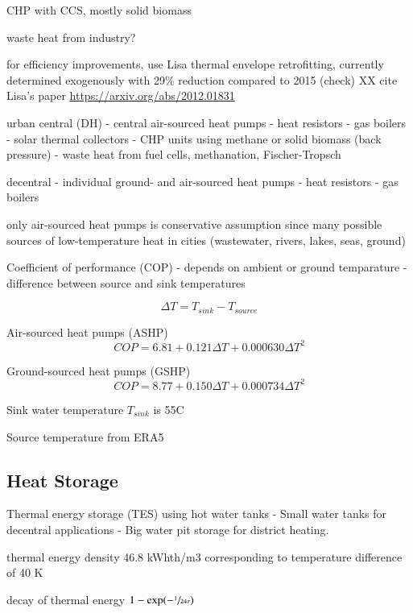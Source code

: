 CHP with CCS, mostly solid biomass

waste heat from industry?

for efficiency improvements, use Lisa thermal envelope retrofitting, currently
determined exogenously with 29\% reduction compared to 2015 (check) XX cite
Lisa's paper \url{https://arxiv.org/abs/2012.01831}

urban central (DH)
- central air-sourced heat pumps 
- heat resistors
- gas boilers
- solar thermal collectors
- CHP units using methane or solid biomass (back pressure)
- waste heat from fuel cells, methanation, Fischer-Tropsch

decentral
- individual ground- and air-sourced heat pumps
- heat resistors
- gas boilers

only air-sourced heat pumps is conservative assumption since many possible sources of
low-temperature heat in cities (wastewater, rivers, lakes, seas, ground)

Coefficient of performance (COP)
- depends on ambient or ground temparature
- difference between source and sink temperatures

\begin{equation}
    \Delta T = T_{sink} - T_{source}
\end{equation}

Air-sourced heat pumps (ASHP)
\begin{equation}
    COP = 6.81 + 0.121 \Delta T + 0.000630 \Delta T^2
\end{equation}

Ground-sourced heat pumps (GSHP)
\begin{equation}
    COP = 8.77 + 0.150 \Delta T + 0.000734 \Delta T^2
\end{equation}

Sink water temperature $T_{sink}$ is 55\deg{}C

Source temperature from ERA5

\subsection{Heat Storage}

Thermal energy storage (TES) using hot water tanks
- Small water tanks for decentral applications
- Big water pit storage for district heating.

thermal energy density 46.8 kWhth/m3 corresponding to temperature difference of 40 K

decay of thermal energy $1-\exp(-\sfrac{1}{24\tau})$

